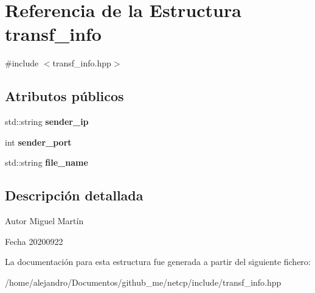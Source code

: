 \hypertarget{structtransf__info}{}\section{Referencia de la Estructura transf\+\_\+info}
\label{structtransf__info}


{\ttfamily \#include $<$transf\+\_\+info.\+hpp$>$}

\subsection*{Atributos públicos}
\begin{DoxyCompactItemize}
\item 
\mbox{\label{structtransf__info_a06640dc1668fdd4cdfdfb0236a466447}} 
std\+::string {\bfseries sender\+\_\+ip}
\item 
\mbox{\label{structtransf__info_a4b26c7290a0f77256fee5c58b049b6e8}} 
int {\bfseries sender\+\_\+port}
\item 
\mbox{\label{structtransf__info_a11504dcdfd2bb6c079411a9bd321a0d5}} 
std\+::string {\bfseries file\+\_\+name}
\end{DoxyCompactItemize}


\subsection{Descripción detallada}
\begin{DoxyAuthor}{Autor}
Miguel Martín 
\end{DoxyAuthor}
\begin{DoxyDate}{Fecha}
20200922 
\end{DoxyDate}


La documentación para esta estructura fue generada a partir del siguiente fichero\+:\begin{DoxyCompactItemize}
\item 
/home/alejandro/\+Documentos/github\+\_\+me/netcp/include/transf\+\_\+info.\+hpp\end{DoxyCompactItemize}

